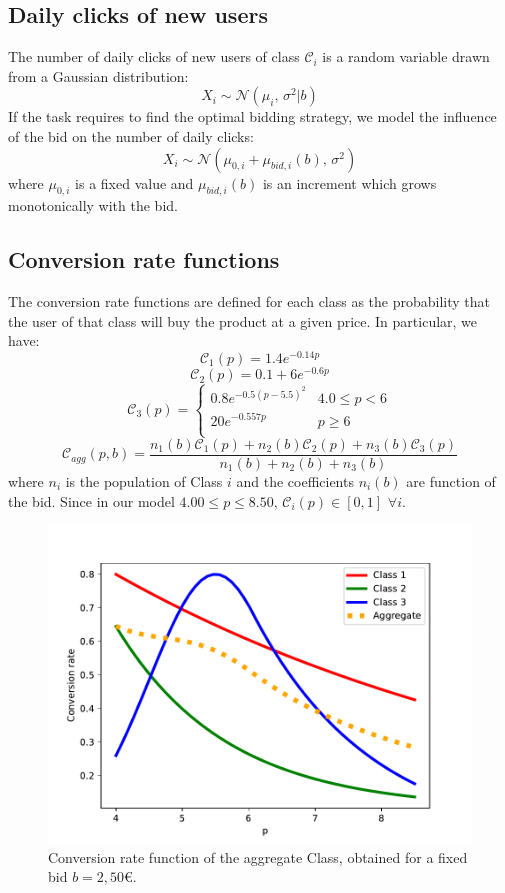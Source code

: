 \documentclass[12pt,a4paper]{report}
\begin{document}
			\subsection{Daily clicks of new users}
The number of daily clicks of new users of class $\mathcal C_i$ is a random variable drawn from a Gaussian distribution:
\[ X_i\sim \mathcal{N}(\mu_i,\,\sigma^{2}|b)\]
If the task requires to find the optimal bidding strategy, we model the influence of the bid on the number of daily clicks:
\[ X_i \sim \mathcal{N}(\mu_{0,i}+\mu_{bid,i}(b),\,\sigma^{2})\]
where $\mu_{0,i}$ is a fixed value and $\mu_{bid,i}(b)$ is an increment which grows monotonically with the bid.

			\subsection{Conversion rate functions}
The conversion rate functions are defined for each class as the probability that the user of that class will buy the product at a given price. In particular, we have:
\[ \mathcal C_1(p) =  1.4 e^{-0.14p}    \]
\[ \mathcal C_2(p) = 0.1+ 6 e^{-0.6p}    \]
\[   \mathcal C_3(p) = \left\{
\begin{array}{ll}
      0.8 e^{-0.5(p-5.5)^2} & 4.0\leq p< 6 \\
      20 e^{-0.557p} & p \geq 6 \\
\end{array} 
\right. \]
\[ \mathcal C_{agg}(p, b) =\frac{n_1(b)\mathcal C_1(p)+n_2(b)\mathcal C_2(p)+n_3(b)\mathcal C_3(p)}{n_1(b)+n_2(b)+n_3(b)}\] 
where $n_i$ is the population of Class $i$ and the coefficients $n_i(b)$ are function of the bid.
Since in our model $4.00 \leq p \leq 8.50$, $\mathcal C_i(p) \in [0,1]$ $ \forall i$.
\begin{figure}[H]
\centering
  \includegraphics[scale = 0.8, center]{Cagg}
  \caption{Conversion rate function of the aggregate Class, obtained for a fixed bid $b=2,50$\euro.}
\end{figure}
\end{document}
